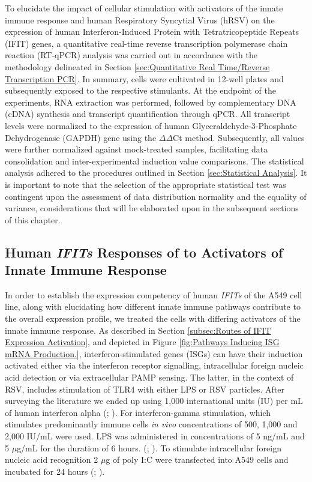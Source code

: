 To elucidate the impact of cellular stimulation with activators of the innate immune response and human Respiratory Syncytial Virus (hRSV) on the expression of human Interferon-Induced Protein with Tetratricopeptide Repeats (IFIT) genes, a quantitative real-time reverse transcription polymerase chain reaction (RT-qPCR) analysis was carried out in accordance with the methodology delineated in Section \ref{sec:Quantitative Real Time/Reverse Transcription PCR}. In summary, cells were cultivated in 12-well plates and subsequently exposed to the respective stimulants. At the endpoint of the experiments, RNA extraction was performed, followed by complementary DNA (cDNA) synthesis and transcript quantification through qPCR. All transcript levels were normalized to the expression of human Glyceraldehyde-3-Phosphate Dehydrogenase (GAPDH) gene using the \(\Delta\)\(\Delta\)Ct method. Subsequently, all values were further normalized against mock-treated samples, facilitating data consolidation and inter-experimental induction value comparisons. The statistical analysis adhered to the procedures outlined in Section \ref{sec:Statistical Analysis}. It is important to note that the selection of the appropriate statistical test was contingent upon the assessment of data distribution normality and the equality of variance, considerations that will be elaborated upon in the subsequent sections of this chapter.

\subsection{Human \textit{IFITs} Responses of to Activators of Innate Immune Response} \label{subsec:Human IFIT Responses to Activators of Innate Immune Response}
In order to establish the expression competency of human \textit{IFITs} of the A549 cell line, along with elucidating how different innate immune pathways contribute to the overall expression profile, we treated the cells with differing activators of the innate immune response. As described in Section \ref{subsec:Routes of IFIT Expression Activation}, and depicted in Figure \ref{fig:Pathways Inducing ISG mRNA Production.},  interferon-stimulated genes (ISGs) can have their induction activated either via the interferon receptor signalling, intracellular foreign nucleic acid detection or via extracellular PAMP sensing. The latter, in the context of RSV, includes stimulation of TLR4 with either LPS or RSV particles. After surveying the literature we ended up using 1,000 international units (IU) per mL of human interferon alpha (\cite{Terenzi2006DistinctISG56}; \cite{Santhakumar2018ChickenViruses}). For interferon-gamma stimulation, which stimulates predominantly immune cells \textit{in vivo} concentrations of 500, 1,000 and 2,000 IU/mL were used. LPS was administered in concentrations of 5 ng/mL and 5 \(\mu\)g/mL for the duration of 6 hours. (\cite{Mears2019Ifit1Cells}; \cite{Zhang2019GrouperResponse}). To stimulate intracellular foreign nucleic acid recognition 2 \(\mu\)g of poly I:C were transfected into A549 cells and incubated for 24 hours (\cite{Mears2019Ifit1Cells}; \cite{Palchetti2015TransfectedCells}).

